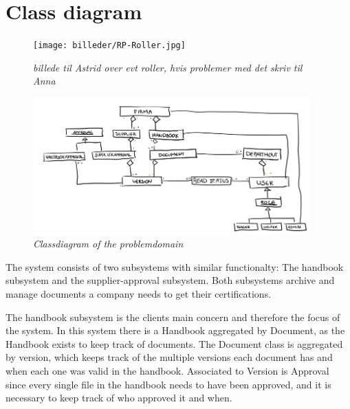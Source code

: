 \section{Class diagram}
\begin{figure}[H]
	\centering
	\texttt{[image: billeder/RP-Roller.jpg]}
	\caption{\textit{\color{red} billede til Astrid over evt roller, hvis problemer med det skriv til Anna}}
	\label{fig:PACT-SystemImage}
\end{figure}



\begin{figure}[H]
	\centering
	\includegraphics[width=0.95\textwidth]{billeder/classDiagram.png}
	\caption{\textit{Classdiagram of the problemdomain
	}}
	\label{fig:PACT-SystemImage}
\end{figure}

The system consists of two subsystems with similar functionalty:
The handbook subsystem and the supplier-approval subsystem.
Both subsystems archive and manage documents a company needs to get their certifications.

The handbook subsystem is the clients main concern and therefore the focus of the system. 
In this system there is a Handbook aggregated by Document, as the Handbook exists to keep track of documents. The Document class is aggregated by version, which keeps track of the multiple versions each document has and when each one was valid in the handbook. Associated to Version is Approval since every single file in the handbook needs to have been approved, and it is necessary to keep track of who approved it and when.

